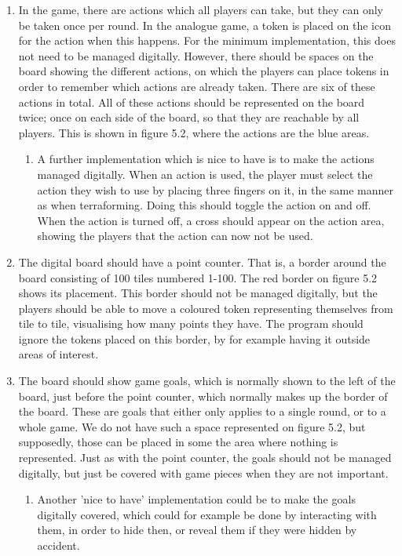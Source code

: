 \begin{enumerate}
\begin{enumerate}
	\end{enumerate}
\item In the game, there are actions which all players can take, but they can only be taken once per round. In the analogue game, a token is placed on the icon for the action when this happens. For the minimum implementation, this does not need to be managed digitally. However, there should be spaces on the board showing the different actions, on which the players can place tokens in order to remember which actions are already taken. There are six of these actions in total. All of these actions should be represented on the board twice; once on each side of the board, so that they are reachable by all players. This is shown in figure 5.2, where the actions are the blue areas. 
	\begin{enumerate}
	\item A further implementation which is nice to have is to make the actions managed digitally. When an action is used, the player must select the action they wish to use by placing three fingers on it, in the same manner as when terraforming. Doing this should toggle the action on and off. When the action is turned off, a cross should appear on the action area, showing the players that the action can now not be used.
	\end{enumerate}
\item The digital board should have a point counter. That is, a border around the board consisting of 100 tiles numbered 1-100. The red border on figure 5.2 shows its placement. This border should not be managed digitally, but the players should be able to move a coloured token representing themselves from tile to tile, visualising how many points they have. The program should ignore the tokens placed on this border, by for example having it outside areas of interest.

\item The board should show game goals, which is normally shown to the left of the board, just before the point counter, which normally makes up the border of the board. These are goals that either only applies to a single round, or to a whole game. We do not have such a space represented on figure 5.2, but supposedly, those can be placed in some the area where nothing is represented. Just as with the point counter, the goals should not be managed digitally, but just be covered with game pieces when they are not important.
	\begin{enumerate}
	\item Another 'nice to have' implementation could be to make the goals digitally covered, which could for example be done by interacting with them, in order to hide then, or reveal them if they were hidden by accident.
	\end{enumerate}
\end{enumerate}
